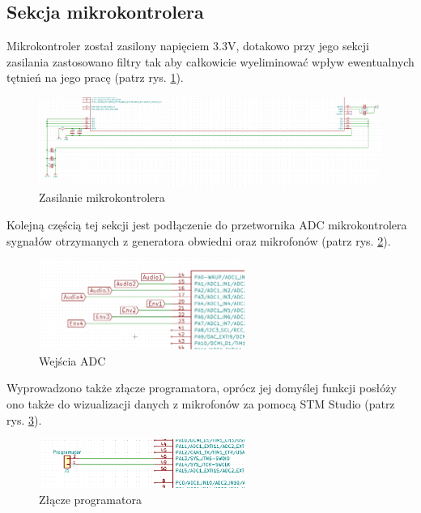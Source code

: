 \documentclass[eng,printmode]{mgr}
\begin{document}
\subsection{Sekcja mikrokontrolera}
Mikrokontroler został zasilony napięciem 3.3V, dotakowo przy jego sekcji zasilania zastosowano filtry tak aby całkowicie wyeliminować wpływ ewentualnych tętnień na jego pracę (patrz rys. \ref{fig-filtry}).
\begin{figure}[ht]

    \centering

  \includegraphics[width=1.1\textwidth, angle=0]{filtry.png}

    \caption{Zasilanie mikrokontrolera}
 \label{fig-filtry}
    

\end{figure}

Kolejną częścią tej sekcji jest podłączenie do przetwornika ADC mikrokontrolera sygnałów otrzymanych z generatora obwiedni oraz mikrofonów (patrz rys. \ref{fig-adc}).
\begin{figure}[ht]

    \centering

  \includegraphics[width=0.6\textwidth, angle=0]{podlaczenie.png}

    \caption{Wejścia ADC}
 \label{fig-adc}
    

\end{figure}

Wyprowadzono także złącze programatora, oprócz jej domyślej funkcji posłóży ono także do wizualizacji danych z mikrofonów za pomocą STM Studio (patrz rys. \ref{fig-programator}).
\begin{figure}[ht]

    \centering

  \includegraphics[width=0.6\textwidth, angle=0]{programator.png}

    \caption{Złącze programatora}
 \label{fig-programator}
    

\end{figure}
\end{document}
